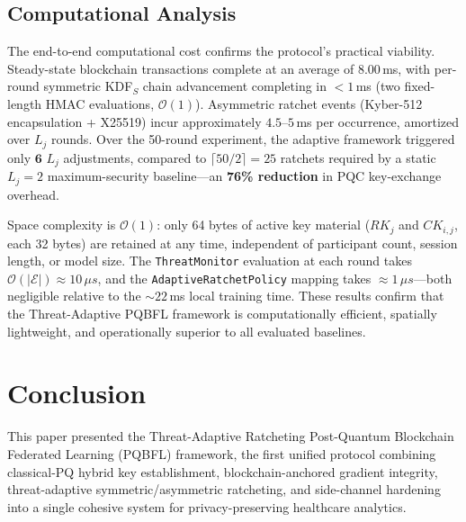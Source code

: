\documentclass[journal, 10pt, twocolumn]{IEEEtran}
\begin{document}
\subsection{Computational Analysis}
The end-to-end computational cost confirms the protocol's practical viability. Steady-state blockchain transactions complete at an average of $8.00$\,ms, with per-round symmetric KDF$_S$ chain advancement completing in $<1$\,ms (two fixed-length HMAC evaluations, $\mathcal{O}(1)$). Asymmetric ratchet events (Kyber-512 encapsulation + X25519) incur approximately $4.5$--$5$\,ms per occurrence, amortized over $L_j$ rounds. Over the 50-round experiment, the adaptive framework triggered only $\mathbf{6}$ $L_j$ adjustments, compared to $\lceil50/2\rceil=25$ ratchets required by a static $L_j=2$ maximum-security baseline---an \textbf{76\% reduction} in PQC key-exchange overhead.

Space complexity is $\mathcal{O}(1)$: only 64 bytes of active key material ($RK_j$ and $CK_{i,j}$, each 32 bytes) are retained at any time, independent of participant count, session length, or model size. The \texttt{ThreatMonitor} evaluation at each round takes $\mathcal{O}(|\mathcal{E}|) \approx 10\,\mu s$, and the \texttt{AdaptiveRatchetPolicy} mapping takes $\approx 1\,\mu s$---both negligible relative to the $\sim 22$\,ms local training time. These results confirm that the Threat-Adaptive PQBFL framework is computationally efficient, spatially lightweight, and operationally superior to all evaluated baselines.

\section{Conclusion}
This paper presented the Threat-Adaptive Ratcheting Post-Quantum Blockchain Federated Learning (PQBFL) framework, the first unified protocol combining classical-PQ hybrid key establishment, blockchain-anchored gradient integrity, threat-adaptive symmetric/asymmetric ratcheting, and side-channel hardening into a single cohesive system for privacy-preserving healthcare analytics.
\end{document}
